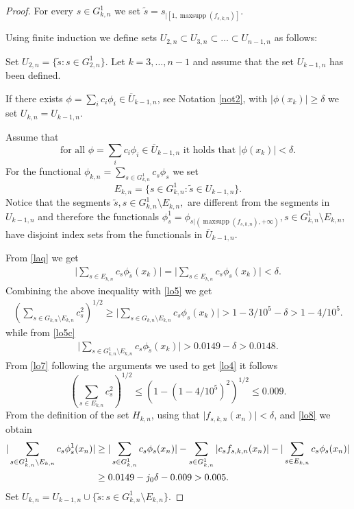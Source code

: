 \documentclass[a4paper]{amsart}
\theoremstyle{plain}
\DeclareMathOperator{\maxsupp}{maxsupp}
\begin{document}
\begin{proof}
For every $s\in G_{k,n}^{1}$ we set $ \tilde{s}=s_{|[1,\maxsupp (f_{s,k,n})]}$.

Using finite induction we define sets  $U_{2,n}\subset U_{3,n}\subset\dots\subset U_{n-1,n}$ as follows:

Set $U_{2,n}=\{\tilde{s}: s\in G_{2,n}^{1}\}$. Let $k=3,\dots,n-1$
and assume that the set  $U_{k-1,n}$ has been defined.

If there exists
$\phi=\sum_{i}c_{i}\phi_{i}\in \overline{U}_{k-1,n}$, see Notation
\ref{not2},  with $\vert \phi(x_{k})\vert\geq\delta$ we set
$U_{k,n}=U_{k-1,n}$.

Assume that
\begin{equation}\label{laq}\mbox{for all $\phi=\sum_{i}c_{i}\phi_{i}\in \overline{U}_{k-1,n}$ it holds that $\vert \phi(x_{k})\vert<\delta$.}
\end{equation}
For the functional $\phi_{k,n}=\sum_{s\in G^{1}_{k,n}}c_{s}\phi_{s}$ we set
$$
E_{k,n}=\{s\in G^{1}_{k,n}: \tilde{s}\in U_{k-1,n}\}.
$$
Notice that the segments $\tilde{s}, s\in G^{1}_{k,n}\setminus E_{k,n},$ are different
from the segments in $U_{k-1,n}$ and therefore the functionals
$\phi_{s}^{1}=\phi_{s|(\maxsupp(f_{s,k,n}),+\infty)}, s\in G^{1}_{k,n}\setminus E_{k,n}$,
have disjoint index sets from the functionals in $\overline{U}_{k-1,n}$.

From \eqref{laq} we get
\begin{align}
\vert \sum_{s\in E_{k,n}}c_{s}\phi_{\tilde{s}}(x_{k})\vert=\vert \sum_{s\in E_{k,n}}c_{s}\phi_{s}(x_{k})\vert<\delta.
\end{align}
Combining the above inequality with \eqref{lo5} we get
\begin{align}\label{lo7}
(\sum_{s\in G_{k,n}\setminus E_{k,n}}c_{s}^{2})^{1/2}\geq \vert \sum_{s\in  G_{k,n}\setminus E_{k,n}}c_{s}\phi_{s}(x_{k})\vert>1-3/10^{5}-\delta>1-4/10^{5}.
\end{align}
while from \eqref{lo5c}
\begin{align}\label{lo7a}
\vert \sum_{s\in  G^{1}_{k,n}\setminus E_{k,n}}c_{s}\phi_{\tilde{s}}(x_{k})\vert>0.0149-\delta>0.0148.
\end{align}
From \eqref{lo7} following the  arguments we used to get \eqref{lo4} it follows
\begin{equation}\label{lo8}
(\sum_{s\in E_{k,n}}c_{s}^{2})^{1/2}\leq (1-(1-4/10^{5})^2)^{1/2}\leq 0.009.
\end{equation}
From the definition of the set $H_{k,n}$, using that $\vert
f_{s,k,n}(x_{n})\vert<\delta$, and \eqref{lo8} we obtain
\begin{align}\label{lo11} \vert
\sum_{s\in G^{1}_{k,n}\setminus E_{k,n}}c_{s}\phi_{s}^{1}(x_{n})\vert &\geq \vert
\sum_{s\in G^{1}_{k,n}}c_{s}\phi_{s}(x_{n})\vert
-
\sum_{s\in G^{1}_{k,n}}\vert c_{s}f_{s,k,n}(x_{n})\vert
-
\vert \sum_{s\in  E_{k,n}}c_{s}\phi_{s}(x_{n})\vert
\notag\\
&\geq 0.0149-j_0\delta-0.009>0.005.
\notag
\end{align}
Set $U_{k,n}=U_{k-1,n}\cup \{\tilde{s}: s\in G^{1}_{k,n}\setminus E_{k,n}\}$.


\end{proof}
\end{document}
